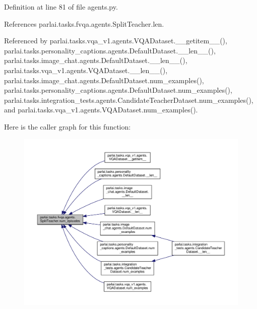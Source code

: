 Definition at line 81 of file agents.\+py.



References parlai.\+tasks.\+fvqa.\+agents.\+Split\+Teacher.\+len.



Referenced by parlai.\+tasks.\+vqa\+\_\+v1.\+agents.\+V\+Q\+A\+Dataset.\+\_\+\+\_\+getitem\+\_\+\+\_\+(), parlai.\+tasks.\+personality\+\_\+captions.\+agents.\+Default\+Dataset.\+\_\+\+\_\+len\+\_\+\+\_\+(), parlai.\+tasks.\+image\+\_\+chat.\+agents.\+Default\+Dataset.\+\_\+\+\_\+len\+\_\+\+\_\+(), parlai.\+tasks.\+vqa\+\_\+v1.\+agents.\+V\+Q\+A\+Dataset.\+\_\+\+\_\+len\+\_\+\+\_\+(), parlai.\+tasks.\+image\+\_\+chat.\+agents.\+Default\+Dataset.\+num\+\_\+examples(), parlai.\+tasks.\+personality\+\_\+captions.\+agents.\+Default\+Dataset.\+num\+\_\+examples(), parlai.\+tasks.\+integration\+\_\+tests.\+agents.\+Candidate\+Teacher\+Dataset.\+num\+\_\+examples(), and parlai.\+tasks.\+vqa\+\_\+v1.\+agents.\+V\+Q\+A\+Dataset.\+num\+\_\+examples().

Here is the caller graph for this function\+:
\nopagebreak
\begin{figure}[H]
\begin{center}
\leavevmode
\includegraphics[width=350pt]{classparlai_1_1tasks_1_1fvqa_1_1agents_1_1SplitTeacher_afb8c188440f9aa2721a308969380f2bc_icgraph}
\end{center}
\end{figure}
\mbox{\label{classparlai_1_1tasks_1_1fvqa_1_1agents_1_1SplitTeacher_a62ae4928ac59b31290846ac15a59c17a}} 
